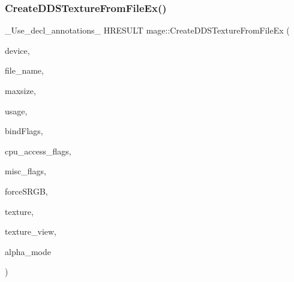 \subsubsection{\texorpdfstring{Create\+D\+D\+S\+Texture\+From\+File\+Ex()}{CreateDDSTextureFromFileEx()}\hspace{0.1cm}{\footnotesize\ttfamily [3/4]}}
{\footnotesize\ttfamily \+\_\+\+Use\+\_\+decl\+\_\+annotations\+\_\+ H\+R\+E\+S\+U\+LT mage\+::\+Create\+D\+D\+S\+Texture\+From\+File\+Ex (\begin{DoxyParamCaption}\item[{I\+D3\+D11\+Device2 $\ast$}]{device,  }\item[{const wchar\+\_\+t $\ast$}]{file\+\_\+name,  }\item[{size\+\_\+t}]{maxsize,  }\item[{D3\+D11\+\_\+\+U\+S\+A\+GE}]{usage,  }\item[{uint32\+\_\+t}]{bind\+Flags,  }\item[{uint32\+\_\+t}]{cpu\+\_\+access\+\_\+flags,  }\item[{uint32\+\_\+t}]{misc\+\_\+flags,  }\item[{bool}]{force\+S\+R\+GB,  }\item[{I\+D3\+D11\+Resource $\ast$$\ast$}]{texture,  }\item[{I\+D3\+D11\+Shader\+Resource\+View $\ast$$\ast$}]{texture\+\_\+view,  }\item[{\hyperlink{namespacemage_a0c586a2bad862f4858900ca121ca80c2}{D\+D\+S\+\_\+\+A\+L\+P\+H\+A\+\_\+\+M\+O\+DE} $\ast$}]{alpha\+\_\+mode }\end{DoxyParamCaption})}

\hypertarget{namespacemage_a098c27d7fa0aa4437d4a878c7eb75792}{}\label{namespacemage_a098c27d7fa0aa4437d4a878c7eb75792} 
